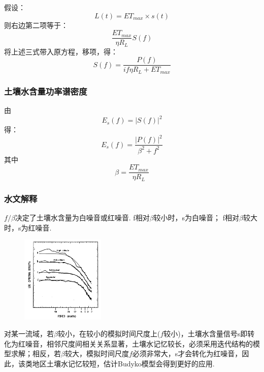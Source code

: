 \documentclass{beamer}
\begin{document}
\begin{CJK}{UTF8}{gkai}
\begin{frame}
假设：
\begin{equation*}
L(t)=ET_{max}\times  s(t)
\end{equation*}
则右边第二项等于：
\begin{equation*}
\frac{ET_{max}}{\eta R_L} S(f)
\end{equation*}
将上述三式带入原方程，移项，得：
\begin{equation*}
S(f)=\frac{P(f)}{if\eta R_L+ET_{max}}
\end{equation*}
\end{frame}

\begin{frame}
\frametitle{土壤水含量功率谱密度}
由
\begin{equation*}
E_s (f)=|S(f)|^2
\end{equation*}
得：
\begin{equation*}
E_s (f)=\frac{|P(f)|^2}{\beta ^2+f^2}
\end{equation*}
其中
\begin{equation*}
\beta=\frac{ET_{max}}{\eta R_L}
\end{equation*}
\end{frame}

\begin{frame}
\frametitle{水文解释}
$f/\beta$决定了土壤水含量为白噪音或红噪音.
f相对$\beta$较小时，s为白噪音；
f相对$\beta$较大时，s为红噪音. 
\begin{figure}[H]
\centering
\includegraphics[width=4cm]{experiment.png}
\end{figure}
对某一流域，若$\beta$较小，在较小的模拟时间尺度上($f$较小)，土壤水含量信号s即转化为红噪音，相邻尺度间相关关系显著，土壤水记忆较长，必须采用迭代结构的模型求解；相反，若$\beta$较大，模拟时间尺度$f$必须非常大，s才会转化为红噪音，因此，该类地区土壤水记忆较短，估计Budyko模型会得到更好的应用.
\end{frame}


 

\end{CJK}
\end{document}
